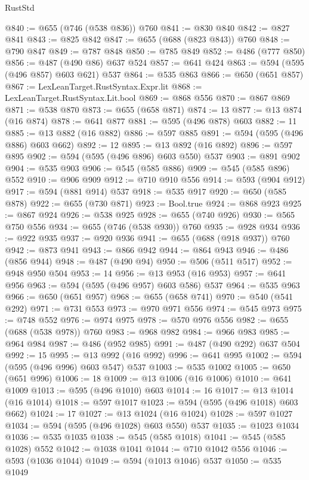\begin{lexlean}{RustStd}
\begin{coremodule}
@840 := @655 (@746 (@538 @836)) @760
@841 := @830 @840
@842 := @827 @841
@843 := @825 @842
@847 := @655 (@688 (@823 @843)) @760
@848 := @790 @847
@849 := @787 @848
@850 := @785 @849
@852 := @486 (@777 @850)
@856 := @487 (@490 @86) @637 @524
@857 := @641 @424
@863 := @594 (@595 (@496 @857) @603 @621) @537
@864 := @535 @863
@866 := @650 (@651 @857)
@867 := LexLeanTarget.RustSyntax.Expr.lit
@868 := LexLeanTarget.RustSyntax.Lit.bool
@869 := @868 @556
@870 := @867 @869
@871 := @538 @870
@873 := @655 (@658 @871)
@874 := 13
@877 := @13 @874 (@16 @874)
@878 := @641 @877
@881 := @595 (@496 @878) @603
@882 := 11
@885 := @13 @882 (@16 @882)
@886 := @597 @885
@891 := @594 (@595 (@496 @886) @603 @662)
@892 := 12
@895 := @13 @892 (@16 @892)
@896 := @597 @895
@902 := @594 (@595 (@496 @896) @603 @550) @537
@903 := @891 @902
@904 := @535 @903
@906 := @545 (@585 @886)
@909 := @545 (@585 @896) @552
@910 := @906 @909
@912 := @710 @910 @556
@914 := @593 (@904 @912)
@917 := @594 (@881 @914) @537
@918 := @535 @917
@920 := @650 (@585 @878)
@922 := @655 (@730 @871)
@923 := Bool.true
@924 := @868 @923
@925 := @867 @924
@926 := @538 @925
@928 := @655 (@740 @926)
@930 := @565 @750 @556
@934 := @655 (@746 (@538 @930)) @760
@935 := @928 @934
@936 := @922 @935
@937 := @920 @936
@941 := @655 (@688 (@918 @937)) @760
@942 := @873 @941
@943 := @866 @942
@944 := @864 @943
@946 := @486 (@856 @944)
@948 := @487 (@490 @94)
@950 := @506 (@511 @517)
@952 := @948 @950 @504
@953 := 14
@956 := @13 @953 (@16 @953)
@957 := @641 @956
@963 := @594 (@595 (@496 @957) @603 @586) @537
@964 := @535 @963
@966 := @650 (@651 @957)
@968 := @655 (@658 @741)
@970 := @540 (@541 @292)
@971 := @731 @553
@973 := @970 @971 @556
@974 := @545 @973
@975 := @748 @552
@976 := @974 @975
@978 := @570 @976 @556
@982 := @655 (@688 (@538 @978)) @760
@983 := @968 @982
@984 := @966 @983
@985 := @964 @984
@987 := @486 (@952 @985)
@991 := @487 (@490 @292) @637 @504
@992 := 15
@995 := @13 @992 (@16 @992)
@996 := @641 @995
@1002 := @594 (@595 (@496 @996) @603 @547) @537
@1003 := @535 @1002
@1005 := @650 (@651 @996)
@1006 := 18
@1009 := @13 @1006 (@16 @1006)
@1010 := @641 @1009
@1013 := @595 (@496 @1010) @603
@1014 := 16
@1017 := @13 @1014 (@16 @1014)
@1018 := @597 @1017
@1023 := @594 (@595 (@496 @1018) @603 @662)
@1024 := 17
@1027 := @13 @1024 (@16 @1024)
@1028 := @597 @1027
@1034 := @594 (@595 (@496 @1028) @603 @550) @537
@1035 := @1023 @1034
@1036 := @535 @1035
@1038 := @545 (@585 @1018)
@1041 := @545 (@585 @1028) @552
@1042 := @1038 @1041
@1044 := @710 @1042 @556
@1046 := @593 (@1036 @1044)
@1049 := @594 (@1013 @1046) @537
@1050 := @535 @1049

\end{coremodule}
\end{lexlean}
